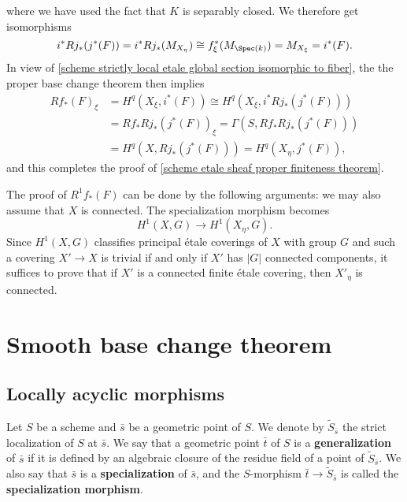where we have used the fact that $K$ is separably closed. We therefore get isomorphisms
\[i^*Rj_*(j^*(F))=i^*Rj_*(M_{X_\eta})\cong f_\xi^*(M_{\Spec(k)})=M_{X_\xi}=i^*(F).\]
In view of \cref{scheme strictly local etale global section isomorphic to fiber}, the the proper base change theorem then implies
\begin{align*}
Rf_*(F)_{\xi}&=H^q(X_\xi,i^*(F))\cong H^q(X_\xi,i^*Rj_*(j^*(F)))\\
&=Rf_*Rj_*(j^*(F))_\xi=\Gamma(S,Rf_*Rj_*(j^*(F)))\\
&=H^q(X,Rj_*(j^*(F)))=H^q(X_\eta,j^*(F)),
\end{align*}
and this completes the proof of \cref{scheme etale sheaf proper finiteness theorem}.

\begin{remark}
The proof of $R^1f_*(F)$ can be done by the following arguments: we may also assume that $X$ is connected. The specialization morphism becomes 
\[H^1(X,G)\to H^1(X_\eta,G).\]
Since $H^1(X,G)$ classifies principal \'etale coverings of $X$ with group $G$ and such a covering $X'\to X$ is trivial if and only if $X'$ has $|G|$ connected components, it suffices to prove that if $X'$ is a connected finite \'etale covering, then $X'_\eta$ is connected. 
\end{remark}

\section{Smooth base change theorem}
\subsection{Locally acyclic morphisms}
Let $S$ be a scheme and $\bar{s}$ be a geometric point of $S$. We denote by $\widetilde{S}_{\bar{s}}$ the strict localization of $S$ at $\bar{s}$. We say that a geometric point $\bar{t}$ of $S$ is a \textbf{generalization} of $\bar{s}$ if it is defined by an algebraic closure of the residue field of a point of $\widetilde{S}_{\bar{s}}$. We also say that $\bar{s}$ is a \textbf{specialization} of $\bar{s}$, and the $S$-morphism $\bar{t}\to\widetilde{S}_{\bar{s}}$ is called the \textbf{specialization morphism}.
